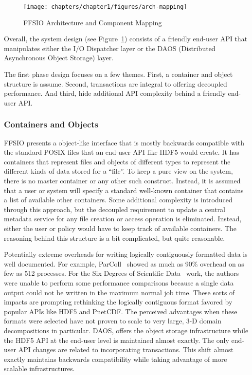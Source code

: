 \begin{figure}[htbp]
\vspace{-0.10in}
\centering
\texttt{[image: chapters/chapter1/figures/arch-mapping]}
\vspace{-0.15in}
\caption{FFSIO Architecture and Component Mapping}
\label{fig:arch-mapping}
\vspace{-0.15in}
\end{figure}

Overall, the system design (see Figure~\ref{fig:arch-mapping}) consists of a
friendly end-user API that manipulates either the I/O Dispatcher layer or the
DAOS (Distributed Asynchronous Object Storage) layer.

The first phase design focuses on a few themes. First, a container and object
structure is assume. Second, transactions are integral to offering decoupled
performance. And third, hide additional API complexity behind a friendly
end-user API.

\subsubsection{Containers and Objects}
FFSIO presents a object-like interface that is mostly backwards compatible with
the standard POSIX files that an end-user API like HDF5 would create. It has
containers that represent files and objects of different types to represent
the different kinds of data stored for a ``file''. To keep a pure view on the
system, there is no master container or any other such construct. Instead, it 
is assumed that a user or system will specify a standard well-known container
that contains a list of available other containers. Some additional complexity
is introduced through this approach, but the decoupled requirement to update a
central metadata service for any file creation or access operation is
eliminated. Instead, either the user or policy would have to keep track of
available containers. The reasoning behind this structure is a bit complicated,
but quite reasonable.

Potentially extreme overheads for writing logically contiguously formatted data
is well documented. For example, ParColl~\cite{yu:2008:parcoll} showed as much
as 90\% overhead on as few as 512 processes. For the Six Degrees of Scientific
Data~\cite{lofstead:2011:six-degrees} work, the authors were unable to perform
some performance comparisons because a single data output could not be written
in the maximum normal job time. These sorts of impacts are prompting rethinking
the logically contiguous format favored by popular APIs like HDF5 and PnetCDF.
The perceived advantages when these formats were selected have not proven to
scale to very large, 3-D domain decompositions in particular. DAOS, offers the
object storage infrastructure while the HDF5 API at the end-user level is
maintained almost exactly. The only end-user API changes are related to
incorporating transactions. This shift almost exactly maintains backwards
compatibility while taking advantage of more scalable infrastructures.

